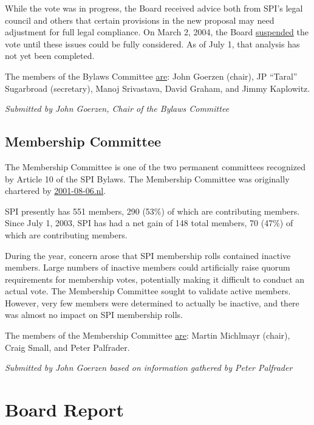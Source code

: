 \documentclass[letterpaper]{report}
\begin{document}
While the vote was in progress, the Board received advice both from
SPI's legal council and others that certain provisions in the new
proposal may need adjustment for full legal compliance. On March 2,
2004, the Board \href{http://lists.spi-inc.org/pipermail/spi-announce/2004/000073.html}{suspended}
the vote until these issues could be fully considered. As of July
1, that analysis has not yet been completed.

The members of the Bylaws Committee \href{http://lists.spi-inc.org/pipermail/spi-bylaws/2003/000003.html}{are}:
John Goerzen (chair), JP ``Taral'' Sugarbroad (secretary), Manoj
Srivastava, David Graham, and Jimmy Kaplowitz.

\emph{Submitted by John Goerzen, Chair of the Bylaws Committee}


\section{Membership Committee}

The Membership Committee is one of the two permanent committees recognized
by Article 10 of the SPI Bylaws. The Membership Committee was originally
chartered by \href{https://www.spi-inc.org/corporate/resolutions/2001/2001-08-06.nl}{2001-08-06.nl}.

SPI presently has 551 members, 290 (53\%) of which are contributing
members. Since July 1, 2003, SPI has had a net gain of 148 total members,
70 (47\%) of which are contributing members.

During the year, concern arose that SPI membership rolls contained
inactive members. Large numbers of inactive members could artificially
raise quorum requirements for membership votes, potentially making
it difficult to conduct an actual vote. The Membership Committee sought
to validate active members. However, very few members were determined
to actually be inactive, and there was almost no impact on SPI membership
rolls.

The members of the Membership Committee \href{https://www.spi-inc.org/meetings/minutes/2003/2003-03-11/}{are}:
Martin Michlmayr (chair), Craig Small, and Peter Palfrader.

\emph{Submitted by John Goerzen based on information gathered by Peter
Palfrader}


\chapter{Board Report}
\end{document}
